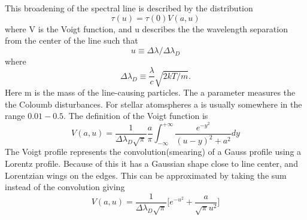 \documentclass{aa}   %
\begin{document}
This broadening of the spectral line is described by the distribution
\begin{equation}
 \tau(u) = \tau(0)V(a,u)
\end{equation}\label{distribution}
where V is the Voigt function, and u describes the the wavelength separation from the center of the line such that
\begin{equation}
 u \equiv \Delta\lambda/\Delta\lambda_D
\end{equation}
where
\begin{equation}
 \Delta\lambda_D \equiv \frac{\lambda}{c} \sqrt{2kT/m}.
\end{equation}
Here m is the mass of the line-causing particles.
The a parameter measures the the Coloumb disturbances. For stellar atomspheres a is usually somewhere in the range $0.01 - 0.5$. The definition of the Voigt function is
\begin{equation}
 V(a,u) = \frac{1}{\Delta\lambda_D\sqrt{\pi}}\frac{a}{\pi}\int_{-\infty}^{+\infty}\frac{e^{-y^2}}{(u-y)^2 + a^2}dy
\end{equation}\label{Voigt}
The Voigt profile represents the convolution(smearing) of a Gauss profile using a Lorentz profile. Because of this it has a Gaussian shape close to line center, and Lorentzian wings on the edges.
This can be approximated by taking the sum instead of the convolution giving 
\begin{equation}
 V(a,u) = \frac{1}{\Delta\lambda_D\sqrt{\pi}} \bigg[e^{-u^2} + \frac{a}{\sqrt{\pi}u^2}\bigg]
\end{equation}\label{Voigt_approx}
\end{document}

